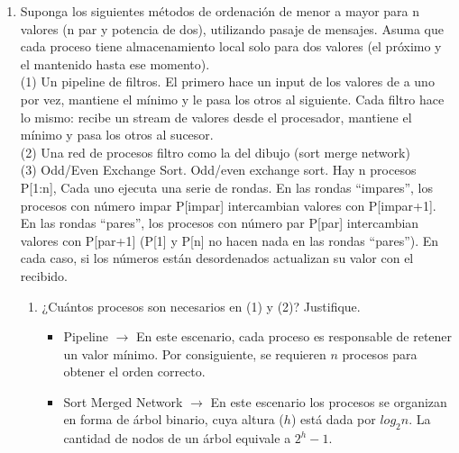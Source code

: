 \documentclass[a4paper, 10pt]{article}
\newenvironment{QandA}{
    \begin{enumerate}\bfseries}
    {\end{enumerate}
}
\newenvironment{answered}{\par\normalfont}{}
\begin{document}
\begin{QandA}
\item Suponga los siguientes métodos de ordenación de menor a mayor para n valores (n par y potencia de dos), utilizando pasaje de mensajes. Asuma que cada proceso tiene almacenamiento local solo para dos valores (el próximo y el mantenido hasta ese momento).
\\ 
(1) Un pipeline de filtros. El primero hace un input de los valores de a uno por vez, mantiene el mínimo y le pasa los otros al siguiente. Cada filtro hace lo mismo: recibe un stream de valores desde el procesador, mantiene el mínimo y pasa los otros al sucesor.
\\ 
(2) Una red de procesos filtro como la del dibujo (sort merge network)
\\ 
(3) Odd/Even Exchange Sort. Odd/even exchange sort. Hay n procesos P[1:n], Cada uno ejecuta una serie de rondas. En las rondas “impares”, los procesos con número impar P[impar] intercambian valores con P[impar+1]. En las rondas “pares”, los procesos con número par P[par] intercambian valores con P[par+1] (P[1] y P[n] no hacen nada en las rondas “pares”). En cada caso, si los números están desordenados actualizan su valor con el recibido.
\begin{enumerate}
\item ¿Cuántos procesos son necesarios en (1) y (2)? Justifique.

\begin{answered}
\begin{itemize}
    \item Pipeline $\rightarrow$ En este escenario, cada proceso es responsable de retener un valor mínimo. Por consiguiente, se requieren $n$ procesos para obtener el orden correcto.
    \item Sort Merged Network $\rightarrow$ En este escenario los procesos se organizan en forma de árbol binario, cuya altura ($h$) está dada por $log_2n$. La cantidad de nodos de un árbol equivale a $2^h - 1$.
\end{itemize}
\end{answered}


\end{enumerate}
\end{QandA}
\end{document}
